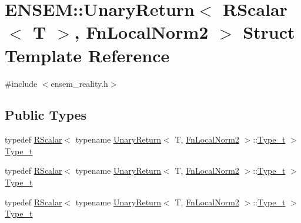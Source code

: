 \hypertarget{structENSEM_1_1UnaryReturn_3_01RScalar_3_01T_01_4_00_01FnLocalNorm2_01_4}{}\section{E\+N\+S\+EM\+:\+:Unary\+Return$<$ R\+Scalar$<$ T $>$, Fn\+Local\+Norm2 $>$ Struct Template Reference}
\label{structENSEM_1_1UnaryReturn_3_01RScalar_3_01T_01_4_00_01FnLocalNorm2_01_4}


{\ttfamily \#include $<$ensem\+\_\+reality.\+h$>$}

\subsection*{Public Types}
\begin{DoxyCompactItemize}
\item 
typedef \mbox{\hyperlink{classENSEM_1_1RScalar}{R\+Scalar}}$<$ typename \mbox{\hyperlink{structENSEM_1_1UnaryReturn}{Unary\+Return}}$<$ T, \mbox{\hyperlink{structENSEM_1_1FnLocalNorm2}{Fn\+Local\+Norm2}} $>$\+::\mbox{\hyperlink{structENSEM_1_1UnaryReturn_3_01RScalar_3_01T_01_4_00_01FnLocalNorm2_01_4_ab989f2d45f35f7fcfa14b6b5f12d66f4}{Type\+\_\+t}} $>$ \mbox{\hyperlink{structENSEM_1_1UnaryReturn_3_01RScalar_3_01T_01_4_00_01FnLocalNorm2_01_4_ab989f2d45f35f7fcfa14b6b5f12d66f4}{Type\+\_\+t}}
\item 
typedef \mbox{\hyperlink{classENSEM_1_1RScalar}{R\+Scalar}}$<$ typename \mbox{\hyperlink{structENSEM_1_1UnaryReturn}{Unary\+Return}}$<$ T, \mbox{\hyperlink{structENSEM_1_1FnLocalNorm2}{Fn\+Local\+Norm2}} $>$\+::\mbox{\hyperlink{structENSEM_1_1UnaryReturn_3_01RScalar_3_01T_01_4_00_01FnLocalNorm2_01_4_ab989f2d45f35f7fcfa14b6b5f12d66f4}{Type\+\_\+t}} $>$ \mbox{\hyperlink{structENSEM_1_1UnaryReturn_3_01RScalar_3_01T_01_4_00_01FnLocalNorm2_01_4_ab989f2d45f35f7fcfa14b6b5f12d66f4}{Type\+\_\+t}}
\item 
typedef \mbox{\hyperlink{classENSEM_1_1RScalar}{R\+Scalar}}$<$ typename \mbox{\hyperlink{structENSEM_1_1UnaryReturn}{Unary\+Return}}$<$ T, \mbox{\hyperlink{structENSEM_1_1FnLocalNorm2}{Fn\+Local\+Norm2}} $>$\+::\mbox{\hyperlink{structENSEM_1_1UnaryReturn_3_01RScalar_3_01T_01_4_00_01FnLocalNorm2_01_4_ab989f2d45f35f7fcfa14b6b5f12d66f4}{Type\+\_\+t}} $>$ \mbox{\hyperlink{structENSEM_1_1UnaryReturn_3_01RScalar_3_01T_01_4_00_01FnLocalNorm2_01_4_ab989f2d45f35f7fcfa14b6b5f12d66f4}{Type\+\_\+t}}
\end{DoxyCompactItemize}



